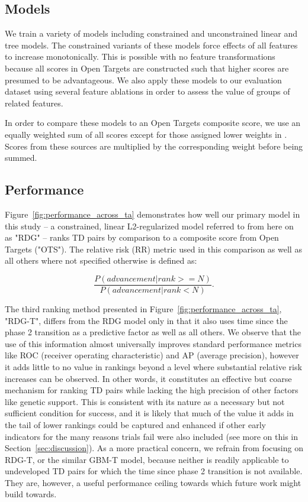 \documentclass{article}
\begin{document}
\subsection{Models}

We train a variety of models including constrained and unconstrained linear and tree models. The constrained variants of these models force effects of all features to increase monotonically. This is possible with no feature transformations because all scores in Open Targets are constructed such that higher scores are presumed to be advantageous. We also apply these models to our evaluation dataset using several feature ablations in order to assess the value of groups of related features.

In order to compare these models to an Open Targets composite score, we use an equally weighted sum of all scores except for those assigned lower weights in \cite{OTweights}. Scores from these sources are multiplied by the corresponding weight before being summed.

\subsection{Performance}
\label{sec:results_performance}

Figure~\ref{fig:performance_across_ta} demonstrates how well our primary model in this study -- a constrained, linear L2-regularized model referred to from here on as "RDG" -- ranks TD pairs by comparison to a composite score from Open Targets ("OTS"). The relative risk (RR) metric used in this comparison as well as all others where not specified otherwise is defined as:

\begin{equation}
  \frac{P(advancement | rank >= N)}{P(advancement | rank < N)}.
\end{equation}

The third ranking method presented in Figure~\ref{fig:performance_across_ta}, "RDG-T", differs from the RDG model only in that it also uses time since the phase 2 transition as a predictive factor as well as all others. We observe that the use of this information almost universally improves standard performance metrics like ROC (receiver operating characteristic) and AP (average precision), however it adds little to no value in rankings beyond a level where substantial relative risk increases can be observed. In other words, it constitutes an effective but coarse mechanism for ranking TD pairs while lacking the high precision of other factors like genetic support. This is consistent with its nature as a necessary but not sufficient condition for success, and it is likely that much of the value it adds in the tail of lower rankings could be captured and enhanced if other early indicators for the many reasons trials fail \cite{Razuvayevskaya2023.02.07.23285407} were also included (see more on this in Section~\ref{sec:discussion}). As a more practical concern, we refrain from focusing on RDG-T, or the similar GBM-T model, because neither is readily applicable to undeveloped TD pairs for which the time since phase 2 transition is not available. They are, however, a useful performance ceiling towards which future work might build towards.
\end{document}
